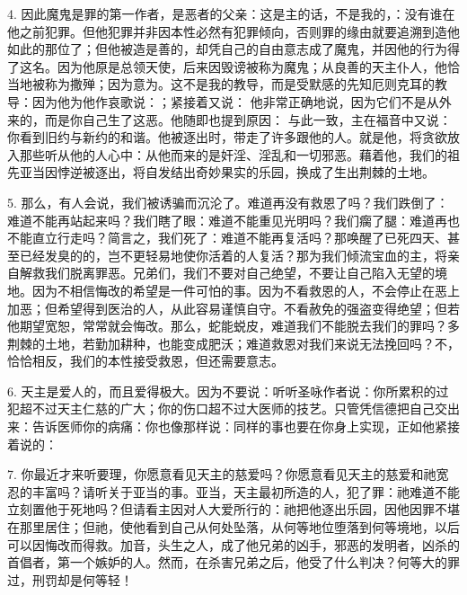 4. 因此魔鬼是罪的第一作者，是恶者的父亲：这是主的话，不是我的，：没有谁在他之前犯罪。但他犯罪并非因本性必然有犯罪倾向，否则罪的缘由就要追溯到造他如此的那位了；但他被造是善的，却凭自己的自由意志成了魔鬼，并因他的行为得了这名。因为他原是总领天使，后来因毁谤被称为魔鬼；从良善的天主仆人，他恰当地被称为撒殚；因为意为。这不是我的教导，而是受默感的先知厄则克耳的教导：因为他为他作哀歌说：；紧接着又说： 他非常正确地说，因为它们不是从外来的，而是你自己生了这恶。他随即也提到原因： 与此一致，主在福音中又说： 你看到旧约与新约的和谐。他被逐出时，带走了许多跟他的人。就是他，将贪欲放入那些听从他的人心中：从他而来的是奸淫、淫乱和一切邪恶。藉着他，我们的祖先亚当因悖逆被逐出，将自发结出奇妙果实的乐园，换成了生出荆棘的土地。\par

5. 那么，有人会说，我们被诱骗而沉沦了。难道再没有救恩了吗？我们跌倒了：难道不能再站起来吗？我们瞎了眼：难道不能重见光明吗？我们瘸了腿：难道再也不能直立行走吗？简言之，我们死了：难道不能再复活吗？那唤醒了已死四天、甚至已经发臭的的，岂不更轻易地使你活着的人复活？那为我们倾流宝血的主，将亲自解救我们脱离罪恶。兄弟们，我们不要对自己绝望，不要让自己陷入无望的境地。因为不相信悔改的希望是一件可怕的事。因为不看救恩的人，不会停止在恶上加恶；但希望得到医治的人，从此容易谨慎自守。不看赦免的强盗变得绝望；但若他期望宽恕，常常就会悔改。那么，蛇能蜕皮，难道我们不能脱去我们的罪吗？多荆棘的土地，若勤加耕种，也能变成肥沃；难道救恩对我们来说无法挽回吗？不，恰恰相反，我们的本性接受救恩，但还需要意志。\par

6. 天主是爱人的，而且爱得极大。因为不要说：听听圣咏作者说：你所累积的过犯超不过天主仁慈的广大；你的伤口超不过大医师的技艺。只管凭信德把自己交出来：告诉医师你的病痛：你也像那样说：同样的事也要在你身上实现，正如他紧接着说的：\par

7. 你最近才来听要理，你愿意看见天主的慈爱吗？你愿意看见天主的慈爱和祂宽忍的丰富吗？请听关于亚当的事。亚当，天主最初所造的人，犯了罪：祂难道不能立刻置他于死地吗？但请看主因对人大爱所行的：祂把他逐出乐园，因他因罪不堪在那里居住；但祂，使他看到自己从何处坠落，从何等地位堕落到何等境地，以后可以因悔改而得救。加音，头生之人，成了他兄弟的凶手，邪恶的发明者，凶杀的首倡者，第一个嫉妒的人。然而，在杀害兄弟之后，他受了什么判决？何等大的罪过，刑罚却是何等轻！\par

